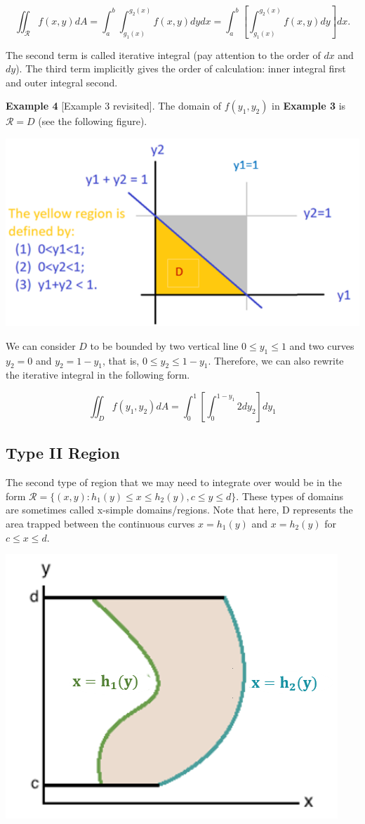 \documentclass[
]{book}
\begin{document}
\[
\iint_{\mathcal{R}}f(x,y)dA = \int_a^b\int_{g_1(x)}^{g_2(x)} f(x,y)dydx = \int_a^b \left[\int_{g_1(x)}^{g_2(x)} f(x,y)dy\right]dx.
\]

The second term is called iterative integral (pay attention to the order of \(dx\) and \(dy\)). The third term implicitly gives the order of calculation: inner integral first and outer integral second.

\hfill\break

\textbf{Example 4} {[}Example 3 revisited{]}. The domain of \(f(y_1, y_2)\) in \textbf{Example 3} is \(\mathcal{R} = D\) (see the following figure).

\begin{center}\includegraphics[width=0.4\linewidth]{topic06/example03DensityBase} \end{center}

We can consider \(D\) to be bounded by two vertical line \(0 \le y_1 \le 1\) and two curves \(y_2 =0\) and \(y_2 = 1 -y_1\), that is, \(0 \le y_2 \le 1 -y_1\). Therefore, we can also rewrite the iterative integral in the following form.

\[
\iint_D f(y_1,y_2)dA = \int_0^1 \left[ \int_0^{1-y_1}2 dy_2 \right] dy_1 
\]

\hfill\break

\hypertarget{type-ii-region}{%
\subsection{Type II Region}\label{type-ii-region}}

The second type of region that we may need to integrate over would be in the form \(\mathcal{R} =\{(x,y):h_1(y) \le x \le h_2(y),c \le y \le d\}\). These types of domains are sometimes called x-simple domains/regions. Note that here, D represents the area trapped between the continuous curves \(x=h_1(y)\) and \(x=h_2(y)\) for \(c \le x \le d\).

\begin{center}\includegraphics[width=0.3\linewidth]{topic06/typeTwoRegion} \end{center}
\end{document}
